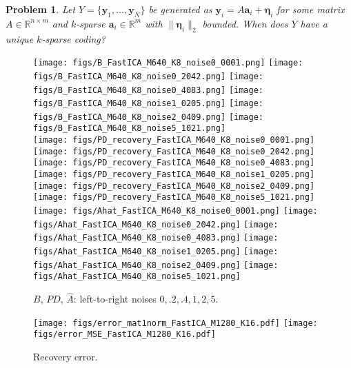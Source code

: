 \documentclass[journal, onecolumn]{IEEEtran}
\newtheorem{problem}{Problem}
\begin{document}
\begin{problem}\label{DUTproblem}
Let $Y = \{\mathbf{y}_1, ..., \mathbf{y}_N \}$ be generated as $\mathbf{y}_i = A\mathbf{a}_i  + \mathbf{\eta}_i$ for some matrix $A \in \mathbb{R}^{n \times m}$ and $k$-sparse $\mathbf{a}_i \in \mathbb{R}^m$ with $\|\mathbf{\eta}_i\|_2$ bounded. When does $Y$ have a unique $k$-sparse coding?
\end{problem}


\begin{figure*}[t!]
\begin{center}
\texttt{[image: figs/B\_FastICA\_M640\_K8\_noise0\_0001.png]}
\texttt{[image: figs/B\_FastICA\_M640\_K8\_noise0\_2042.png]}
\texttt{[image: figs/B\_FastICA\_M640\_K8\_noise0\_4083.png]}
\texttt{[image: figs/B\_FastICA\_M640\_K8\_noise1\_0205.png]}
\texttt{[image: figs/B\_FastICA\_M640\_K8\_noise2\_0409.png]}
\texttt{[image: figs/B\_FastICA\_M640\_K8\_noise5\_1021.png]}\\
\texttt{[image: figs/PD\_recovery\_FastICA\_M640\_K8\_noise0\_0001.png]}
\texttt{[image: figs/PD\_recovery\_FastICA\_M640\_K8\_noise0\_2042.png]}
\texttt{[image: figs/PD\_recovery\_FastICA\_M640\_K8\_noise0\_4083.png]}
\texttt{[image: figs/PD\_recovery\_FastICA\_M640\_K8\_noise1\_0205.png]}
\texttt{[image: figs/PD\_recovery\_FastICA\_M640\_K8\_noise2\_0409.png]}
\texttt{[image: figs/PD\_recovery\_FastICA\_M640\_K8\_noise5\_1021.png]} \\
\texttt{[image: figs/Ahat\_FastICA\_M640\_K8\_noise0\_0001.png]}
\texttt{[image: figs/Ahat\_FastICA\_M640\_K8\_noise0\_2042.png]}
\texttt{[image: figs/Ahat\_FastICA\_M640\_K8\_noise0\_4083.png]}
\texttt{[image: figs/Ahat\_FastICA\_M640\_K8\_noise1\_0205.png]}
\texttt{[image: figs/Ahat\_FastICA\_M640\_K8\_noise2\_0409.png]}
\texttt{[image: figs/Ahat\_FastICA\_M640\_K8\_noise5\_1021.png]}
\caption{$B$, $PD$, $\hat{A}$: left-to-right noises $0, .2, .4, 1, 2, 5$.}
\end{center}
\end{figure*}

\begin{figure*}[t!]
\begin{center}
\texttt{[image: figs/error\_mat1norm\_FastICA\_M1280\_K16.pdf]}
\texttt{[image: figs/error\_MSE\_FastICA\_M1280\_K16.pdf]}
\caption{Recovery error.}
\end{center}
\end{figure*}
\end{document}
